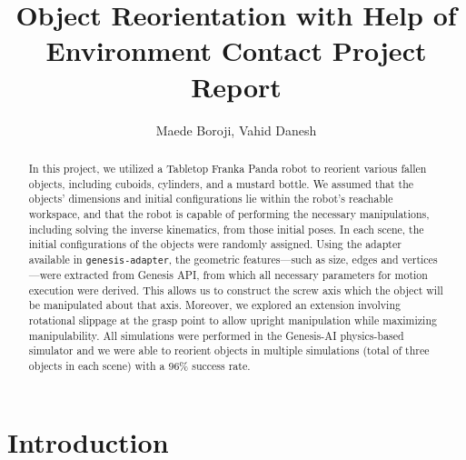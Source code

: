\documentclass{article}
\title{Object Reorientation with Help of Environment Contact
Project Report}
\author{Maede Boroji, Vahid Danesh}
\date{}
\begin{document}
\maketitle

\begin{abstract}
In this project, we utilized a Tabletop Franka Panda robot to reorient various fallen objects, including cuboids, cylinders, and a mustard bottle. 
We assumed that the objects' dimensions and initial configurations lie within the robot’s reachable workspace, and that the robot is capable of performing the necessary manipulations, including solving the inverse kinematics, from those initial poses. 
In each scene, the initial configurations of the objects were randomly assigned. Using the adapter available in \texttt{genesis-adapter}, the geometric features—such as size, edges and vertices—were extracted from Genesis API, from which all necessary parameters for motion execution were derived.
This allows us to construct the screw axis which the object will be manipulated about that axis.
Moreover, we explored an extension involving rotational slippage at the grasp point to allow upright manipulation while maximizing manipulability.
All simulations were performed in the Genesis-AI physics-based simulator and we were able to reorient objects in multiple simulations (total of three objects in each scene) with a 96\% success rate. 
\end{abstract}

\section{Introduction}
\end{document}
